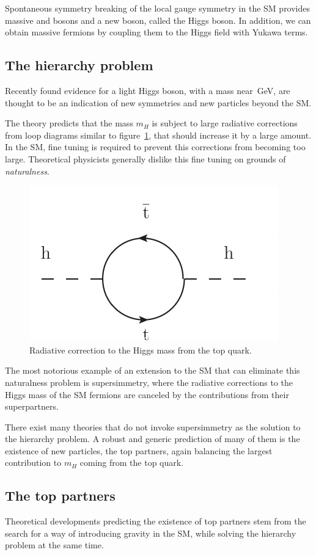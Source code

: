 Spontaneous symmetry breaking of the local gauge symmetry in the SM provides massive
\W and \Z bosons and a new boson, called the Higgs boson.
In addition, we can obtain massive fermions by coupling them to the Higgs
field with Yukawa terms.

\subsection{The hierarchy problem}
Recently found evidence for a light Higgs boson, with a mass
near~\unit[125]{GeV}, are thought to be an indication of new symmetries and
new particles beyond the SM.

The theory predicts that the mass $m_H$ is subject to large radiative
corrections from loop diagrams similar to figure~\ref{fig:higgs_correction},
that should increase it by a large amount.
In the SM, fine tuning is required to prevent this corrections from becoming
too large. Theoretical physicists generally dislike this fine tuning on grounds of
\emph{naturalness}.

\begin{figure}[htb]
    \centering
    \includegraphics[width=.4\textwidth]{images/pdf/higgs_correction}
    \caption{Radiative correction to the Higgs mass from the top quark.}
    \label{fig:higgs_correction}
\end{figure}

The most notorious example of an extension to the SM that can eliminate this
naturalness problem is supersimmetry, where the radiative corrections to
the Higgs mass of the SM fermions are canceled by the contributions from
their superpartners.

There exist many theories that do not invoke supersimmetry as the solution
to the hierarchy problem. A robust and generic prediction of many of them is the
existence of new particles, the top partners, again balancing the
largest contribution to $m_H$ coming from the top quark.

\subsection{The top partners}\label{sec:top_partner_theory}
Theoretical developments predicting the existence of top partners stem from
the search for a way of introducing gravity in the SM, while solving the
hierarchy problem at the same time.

